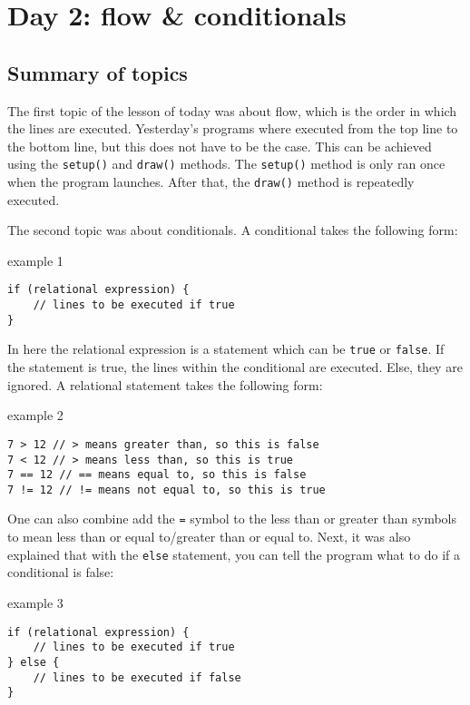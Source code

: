 \chapter{Day 2: flow \& conditionals}

\section{Summary of topics}
The first topic of the lesson of today was about flow, which is the order in which the lines are executed. Yesterday's programs where executed from the top line to the bottom line, but this does not have to be the case. This can be achieved using the \texttt{setup()} and \texttt{draw()} methods. The \texttt{setup()} method is only ran once when the program launches. After that, the \texttt{draw()} method is repeatedly executed.

The second topic was about conditionals. A conditional takes the following form:

\begin{codebox}{example 1}
    \begin{lstlisting}
if (relational expression) {
    // lines to be executed if true
}
    \end{lstlisting}
\end{codebox}

In here the relational expression is a statement which can be \texttt{true} or \texttt{false}. If the statement is true, the lines within the conditional are executed. Else, they are ignored. A relational statement takes the following form:

\begin{codebox}{example 2}
    \begin{lstlisting}
7 > 12 // > means greater than, so this is false
7 < 12 // > means less than, so this is true
7 == 12 // == means equal to, so this is false
7 != 12 // != means not equal to, so this is true
    \end{lstlisting}
\end{codebox}

One can also combine add the \texttt{=} symbol to the less than or greater than symbols to mean less than or equal to/greater than or equal to. Next, it was also explained that with the \texttt{else} statement, you can tell the program what to do if a conditional is false:

\begin{codebox}{example 3}
    \begin{lstlisting}
if (relational expression) {
    // lines to be executed if true
} else {
    // lines to be executed if false
}
    \end{lstlisting}
\end{codebox}

